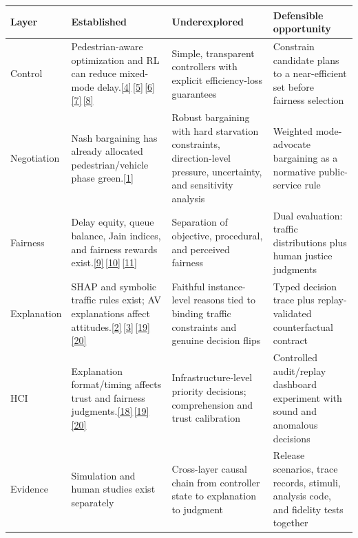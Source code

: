 \documentclass[
  english,
  11pt,
  a4paper,
]{article}
\newcounter{none} %
\begin{document}
{\def\LTcaptype{none} %
\begin{longtable}[]{@{}
  >{\raggedright\arraybackslash}p{}
  >{\raggedright\arraybackslash}p{}
  >{\raggedright\arraybackslash}p{}
  >{\raggedright\arraybackslash}p{}@{}}
\toprule\noalign{}
\begin{minipage}[b]{\linewidth}\raggedright
Layer
\end{minipage} & \begin{minipage}[b]{\linewidth}\raggedright
Established
\end{minipage} & \begin{minipage}[b]{\linewidth}\raggedright
Underexplored
\end{minipage} & \begin{minipage}[b]{\linewidth}\raggedright
Defensible opportunity
\end{minipage} \\
\midrule\noalign{}
\endhead
\bottomrule\noalign{}
\endlastfoot
Control & Pedestrian-aware optimization and RL can reduce mixed-mode
delay.\hyperref[source-4]{[4]}\,\hyperref[source-5]{[5]}\,\hyperref[source-6]{[6]}\,\hyperref[source-7]{[7]}\,\hyperref[source-8]{[8]}
& Simple, transparent controllers with explicit efficiency-loss
guarantees & Constrain candidate plans to a near-efficient set before
fairness selection \\
Negotiation & Nash bargaining has already allocated pedestrian/vehicle
phase green.\hyperref[source-1]{[1]} & Robust bargaining with hard
starvation constraints, direction-level pressure, uncertainty, and
sensitivity analysis & Weighted mode-advocate bargaining as a normative
public-service rule \\
Fairness & Delay equity, queue balance, Jain indices, and fairness
rewards
exist.\hyperref[source-9]{[9]}\,\hyperref[source-10]{[10]}\,\hyperref[source-11]{[11]}
& Separation of objective, procedural, and perceived fairness & Dual
evaluation: traffic distributions plus human justice judgments \\
Explanation & SHAP and symbolic traffic rules exist; AV explanations
affect
attitudes.\hyperref[source-2]{[2]}\,\hyperref[source-3]{[3]}\,\hyperref[source-19]{[19]}\,\hyperref[source-20]{[20]}
& Faithful instance-level reasons tied to binding traffic constraints
and genuine decision flips & Typed decision trace plus replay-validated
counterfactual contract \\
HCI & Explanation format/timing affects trust and fairness
judgments.\hyperref[source-18]{[18]}\,\hyperref[source-19]{[19]}\,\hyperref[source-20]{[20]}
& Infrastructure-level priority decisions; comprehension and trust
calibration & Controlled audit/replay dashboard experiment with sound
and anomalous decisions \\
Evidence & Simulation and human studies exist separately & Cross-layer
causal chain from controller state to explanation to judgment & Release
scenarios, trace records, stimuli, analysis code, and fidelity tests
together \\
\end{longtable}
}
\end{document}
